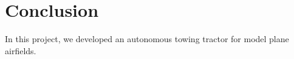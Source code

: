 \section{Conclusion}{
In this project, we developed an autonomous towing tractor for model plane airfields. 

}